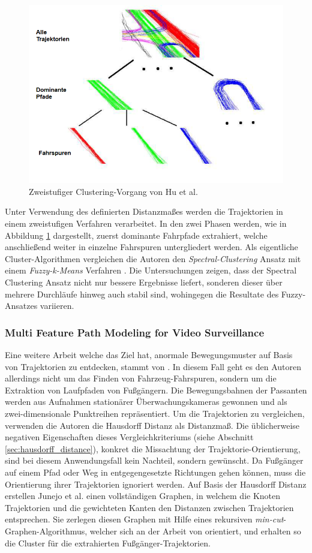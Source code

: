 \begin{figure}[H]
    \centering
    \includegraphics[width=0.5\linewidth]{../resources/img/RelatedWork/Fu_HierarchicalClustering}
    \caption[Zweistufiger Clustering-Vorgang von Hu et al.]{Zweistufiger Clustering-Vorgang von Hu et al. \cite[]{Hu2005}}
    \label{fig:relw_hu_two_step_cluster}
\end{figure}

Unter Verwendung des definierten Distanzmaßes werden die Trajektorien in einem zweistufigen Verfahren verarbeitet.
In den zwei Phasen werden, wie in Abbildung \ref{fig:relw_hu_two_step_cluster} dargestellt, zuerst dominante
Fahrpfade extrahiert, welche anschließend weiter in einzelne Fahrspuren untergliedert werden.
Als eigentliche Cluster-Algorithmen vergleichen die Autoren den \textit{Spectral-Clustering} Ansatz \cite[]{Ng2002}
mit einem \textit{Fuzzy-k-Means} Verfahren \cite[]{xie1991validity}.
Die Untersuchungen zeigen, dass der Spectral Clustering Ansatz nicht nur bessere Ergebnisse liefert, sonderen dieser
über mehrere Durchläufe hinweg auch stabil sind, wohingegen die Resultate des Fuzzy-Ansatzes variieren.


\subsubsection*{Multi Feature Path Modeling for Video Surveillance}
Eine weitere Arbeit welche das Ziel hat, anormale Bewegungsmuster auf Basis von Trajektorien zu entdecken,
stammt von \cite[]{Junejo2004}. In diesem Fall geht es den Autoren allerdings nicht um das Finden von Fahrzeug-Fahrspuren,
sondern um die Extraktion von Laufpfaden von Fußgängern.
Die Bewegungsbahnen der Passanten werden aus Aufnahmen stationärer Überwachungskameras gewonnen und
als zwei-dimensionale Punktreihen repräsentiert.
Um die Trajektorien zu vergleichen, verwenden die Autoren die Hausdorff Distanz als Distanzmaß.
Die üblicherweise negativen Eigenschaften dieses
Vergleichkriteriums (siehe Abschnitt \ref{sec:hausdorff_distance}), konkret die Missachtung der
Trajektorie-Orientierung, sind bei diesem Anwendungsfall kein Nachteil, sondern gewünscht.
Da Fußgänger auf einem Pfad oder Weg in entgegengesetzte Richtungen gehen können, muss die Orientierung
ihrer Trajektorien ignoriert werden.
Auf Basis der Hausdorff Distanz erstellen Junejo et al. einen vollständigen Graphen, in welchem die Knoten Trajektorien
und die gewichteten Kanten den Distanzen zwischen Trajektorien entsprechen.
Sie zerlegen diesen Graphen mit Hilfe eines rekursiven \textit{min-cut}-Graphen-Algorithmus, welcher sich
an der Arbeit von \cite[]{boykov2004experimental} orientiert, und erhalten so die Cluster für die
extrahierten Fußgänger-Trajektorien.

